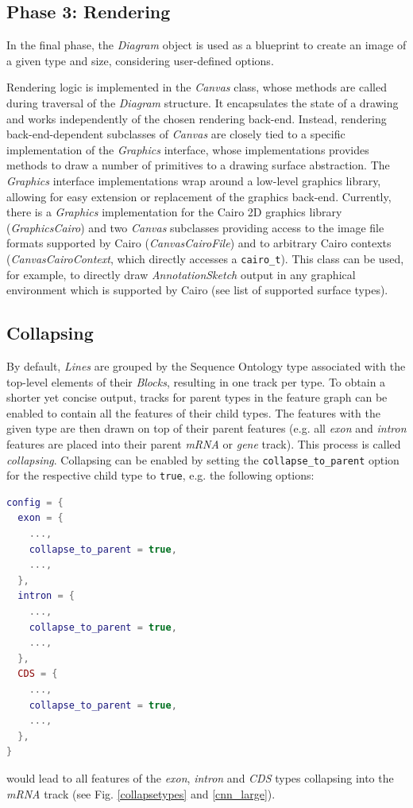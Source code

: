 \documentclass[a4paper]{scrreprt}
\begin{document}
\subsection{Phase 3: Rendering}
In the final phase, the \emph{Diagram} object is used as a blueprint to create an
image of a given type and size, considering user-defined options.

Rendering logic is implemented in the \emph{Canvas} class, whose methods are called during traversal of the \emph{Diagram} structure. It encapsulates the state of a drawing and works independently of the chosen rendering back-end. Instead, rendering back-end-dependent subclasses of \emph{Canvas} are closely tied to a specific implementation of the \emph{Graphics} interface, whose implementations provides methods to draw a number of primitives to a drawing surface abstraction. The \emph{Graphics} interface implementations wrap around a low-level graphics library, allowing for easy extension or replacement of the graphics back-end. Currently, there is a \emph{Graphics} implementation for the Cairo 2D graphics library (\emph{GraphicsCairo}) and two \emph{Canvas} subclasses providing access to the image file formats supported by Cairo (\emph{CanvasCairoFile}) and to arbitrary Cairo contexts (\emph{CanvasCairoContext}, which directly accesses a \texttt{cairo\_t}). This class can be used, for example, to directly draw \emph{AnnotationSketch} output in any graphical environment which is supported by Cairo (see  list of supported surface types).



\subsection{Collapsing}
By default, \emph{Lines} are grouped by the Sequence Ontology type associated with the top-level elements of their \emph{Blocks}, resulting in one track per type.
To obtain a shorter yet concise output, tracks for parent types in the feature graph can be enabled to contain all the features of their child types. The features with the given type are then drawn on top of their parent features (e.g. all \emph{exon} and \emph{intron} features are placed into their parent \emph{mRNA} or \emph{gene} track). This process is called \emph{collapsing}. Collapsing can be enabled by setting the \texttt{collapse\_to\_parent} option for the respective child type to \texttt{true}, e.g. the following options:

\begin{lstlisting}[language=Lua, showstringspaces=false,numbers=none,frame=single]
config = {
  exon = {
    ...,
    collapse_to_parent = true,
    ...,
  },
  intron = {
    ...,
    collapse_to_parent = true,
    ...,
  },
  CDS = {
    ...,
    collapse_to_parent = true,
    ...,
  },
}
\end{lstlisting}
would lead to all features of the \emph{exon}, \emph{intron} and \emph{CDS} types collapsing into the \emph{mRNA} track (see Fig. \ref{collapsetypes} and \ref{cnn_large}).
\end{document}
